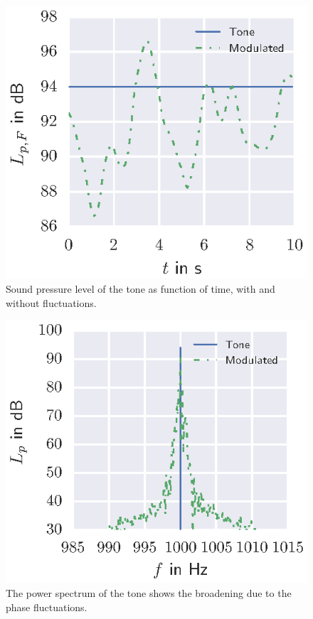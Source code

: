 \begin{figure}[H]
  \centering
  \includegraphics[]{../figures/manual/turbulence-model/modulated_levels}
  \caption{Sound pressure level of the tone as function of time, with and without fluctuations.}
  \label{fig:results_tone_levels}
\end{figure}



\begin{figure}[H]
  \centering
  \includegraphics[]{../figures/manual/turbulence-model/tone_broadening}
  \caption{The power spectrum of the tone shows the broadening due to the phase fluctuations.}
  \label{fig:results_tone_broadening}
\end{figure}

